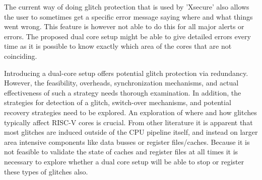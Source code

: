 The current way of doing glitch protection that is used by 'Xsecure' also allows the user to sometimes get a specific error message saying where and what things went wrong. This feature is however not able to do this for all major alerts or errors. The proposed dual core setup might be able to give detailed errors every time as it is possible to know exactly which area of the cores that are not coinciding. 

Introducing a dual-core setup offers potential glitch protection via redundancy. However, the feasibility, overheads, synchronization mechanisms, and actual effectiveness of such a strategy needs thorough examination. In addition, the strategies for detection of a glitch, switch-over mechanisms, and potential recovery strategies need to be explored. An exploration of where and how glitches typically affect RISC-V cores is crucial. From other literature it is apparent that most glitches are induced outside of the CPU pipeline itself, and instead on larger area intensive components like data busses or register files/caches\cite{emfi_injection}. Because it is not feasible to validate the state of caches and register files at all times it is necessary to explore whether a dual core setup will be able to stop or register these types of glitches also.  




